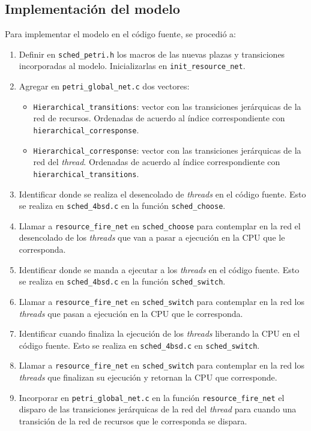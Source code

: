 \documentclass[a4paper]{book}
\begin{document}
\subsection{Implementaci\'on del modelo}
Para implementar el modelo en el c\'odigo fuente, se procedi\'o a:
\begin{enumerate}
\item Definir en \verb|sched_petri.h| los macros de las nuevas plazas y transiciones incorporadas al modelo. Inicializarlas en \verb|init_resource_net|.
\item Agregar en \verb|petri_global_net.c| dos vectores:
\begin{itemize}
\item \verb|Hierarchical_transitions|: vector con las transiciones jer\'arquicas de la red de recursos. Ordenadas de acuerdo al \'indice correspondiente con \verb|hierarchical_corresponse|.
\item \verb|Hierarchical_corresponse|: vector con las transiciones jer\'arquicas de la red del \emph{thread}. Ordenadas de acuerdo al \'indice correspondiente con \verb|hierarchical_transitions|.
\end{itemize}
\item Identificar donde se realiza el desencolado de \emph{threads} en el c\'odigo fuente. Esto se realiza en \verb|sched_4bsd.c| en la funci\'on \verb|sched_choose|.
\item Llamar a \verb|resource_fire_net| en \verb|sched_choose| para contemplar en la red el desencolado de los \emph{threads} que van a pasar a ejecuci\'on en la CPU que le corresponda.
\item Identificar donde se manda a ejecutar a los \emph{threads} en el c\'odigo fuente. Esto se realiza en \verb|sched_4bsd.c| en la funci\'on \verb|sched_switch|.
\item Llamar a \verb|resource_fire_net| en \verb|sched_switch| para contemplar en la red los \emph{threads} que pasan a ejecuci\'on en la CPU que le corresponda.
\item Identificar cuando finaliza la ejecuci\'on de los \emph{threads} liberando la CPU en el c\'odigo fuente. Esto se realiza en \verb|sched_4bsd.c| en \verb|sched_switch|.
\item Llamar a \verb|resource_fire_net| en \verb|sched_switch| para contemplar en la red los \emph{threads} que finalizan su ejecuci\'on y retornan la CPU que corresponde.
\item Incorporar en \verb|petri_global_net.c| en la funci\'on \verb|resource_fire_net| el disparo de las transiciones jer\'arquicas de la red del \emph{thread} para cuando una transici\'on de la red de recursos que le corresponda se dispara.
\end{enumerate}
\end{document}
